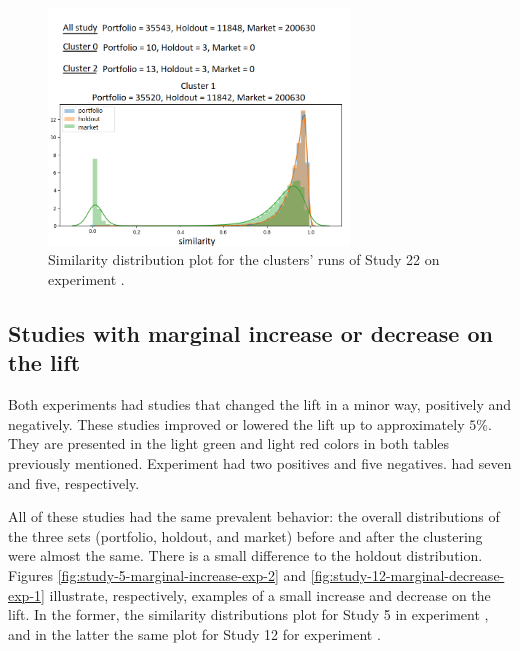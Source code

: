 \begin{figure}[H]
   \centering
   \includegraphics[width=8cm   ]{fig/ch4-study-22-clusters-simi-plot.png}
   \caption{Similarity distribution plot for the clusters' runs of Study 22 on experiment \nameExperimentI{}.}
   \label{fig:study-22-clusters-simi-plot}
\end{figure}

\subsection{Studies with marginal increase or decrease on the lift}
\label{ch:marginal-change}

Both experiments had studies that changed the lift in a minor way, positively and negatively. These studies improved or lowered the lift up to approximately $5\%$. They are presented in the light green and light red colors in both tables previously mentioned. Experiment \nameExperimentI{} had two positives and five negatives. \nameExperimentII{} had seven and five, respectively.

All of these studies had the same prevalent behavior: the overall distributions of the three sets (portfolio, holdout, and market) before and after the clustering were almost the same. There is a small difference to the holdout distribution. Figures \ref{fig:study-5-marginal-increase-exp-2} and \ref{fig:study-12-marginal-decrease-exp-1} illustrate, respectively, examples of a small increase and decrease on the lift. In the former, the similarity distributions plot for Study 5 in experiment \nameExperimentII{}, and in the latter the same plot for Study 12 for experiment \nameExperimentI{}.

